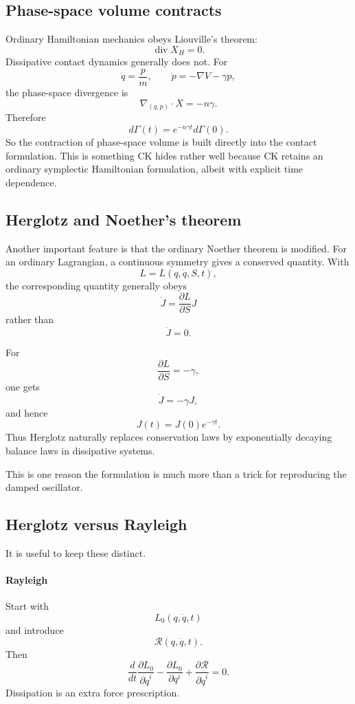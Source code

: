 \subsection{Phase-space volume contracts}

Ordinary Hamiltonian mechanics obeys Liouville's theorem:
$$ \operatorname{div}X_H=0. $$
Dissipative contact dynamics generally does not.
For $$ \dot q=\frac{p}{m}, \qquad \dot p=-\nabla V-\gamma p, $$
the phase-space divergence is
$$ \nabla_{(q,p)}\cdot X = -n\gamma. $$
Therefore
$$ \boxed{ d\Gamma(t)=e^{-n\gamma t}d\Gamma(0). } $$
So the contraction of phase-space volume is built directly into the contact formulation.
This is something CK hides rather well because CK retains an ordinary symplectic Hamiltonian formulation, albeit with explicit time dependence.

\subsection{ Herglotz and Noether's theorem}

Another important feature is that the ordinary Noether theorem is modified.
For an ordinary Lagrangian, a continuous symmetry gives a conserved quantity. With $$ L=L(q,\dot q,S,t), $$ the corresponding quantity generally obeys
$$ \dot J = \frac{\partial L}{\partial S}J $$
rather than $$ \dot J=0. $$

For $$ \frac{\partial L}{\partial S}=-\gamma, $$
one gets $$ \boxed{ \dot J=-\gamma J, } $$
and hence $$ J(t)=J(0)e^{-\gamma t}. $$
Thus Herglotz naturally replaces conservation laws by exponentially decaying balance laws in dissipative systems.

This is one reason the formulation is much more than a trick for reproducing the damped oscillator.

\subsection{Herglotz versus Rayleigh}

It is useful to keep these distinct.

\paragraph{Rayleigh}
Start with $$ L_0(q,\dot q,t) $$
and introduce $$ \mathcal R(q,\dot q,t). $$
Then
$$ \frac{d}{dt} \frac{\partial L_0}{\partial\dot q^i} - \frac{\partial L_0}{\partial q^i} + \frac{\partial\mathcal R}{\partial\dot q^i} =0. $$
Dissipation is an extra force prescription.

